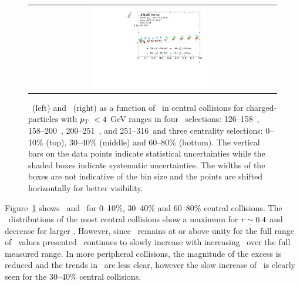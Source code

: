 \begin{figure}
{\begin{tabular}{cc}
	 \includegraphics[width=0.5\textwidth]{figures/main/results/RDpT_jetshape_cent5.pdf} \\
\end{tabular} }
   \caption{\RTheta\ (left) and \RP\ (right) as a function of \rvar\ in central collisions for charged-particles with $\mbox{$p_{\mathrm{T}}$}\ < 4$ GeV ranges in four \ptjet\ selections: 126--158~\GeV, 158--200~\GeV, 200--251~\GeV, and 251--316~\GeV and three centrality selections: 0--10\% (top), 30--40\% (middle) and 60--80\% (bottom).
The vertical bars on the data points indicate statistical uncertainties while the shaded boxes indicate systematic uncertainties.
The widths of the boxes are not indicative of the bin size and the points are shifted horizontally for better visibility.
}
      \label{fig:RPRT}
\end{figure}


Figure~\ref{fig:RPRT} shows \RTheta\ and \RP\ for 0--10\%, 30--40\% and 60--80\% central collisions.
 The \RTheta\ 
distributions of the most central collisions show a maximum for $\mbox{$r$} \sim 0.4$ and decrease for larger \rvar.
However, since \RTheta\ remains at or above unity for the full range of \rvar\ values presented \RP\ continues
to slowly increase with increasing \rvar\ over the full measured range.
 In more peripheral collisions,
the magnitude of the excess is reduced and the trends in \RTheta\ are less clear, however the slow increase
of \RP\ is clearly seen for the 30--40\% central collisions.






\FloatBarrier
